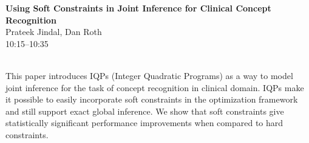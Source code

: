 \documentclass[twoside,makeidx]{book}
\begin{document}
\par\vspace{2em}\noindent%
\begin{minipage}{\linewidth}%
\begin{center}
\textbf{\normalsize Using Soft Constraints in Joint Inference for Clinical Concept Recognition}\\
\normalsize  Prateek Jindal,  Dan Roth\\
{\small 10:15--10:35}\\
\end{center}
\end{minipage}\\[0.5em]
\nopagebreak%
\noindent%
{\small This paper introduces IQPs (Integer Quadratic Programs) as a way to model joint inference for the task of concept recognition in clinical domain. IQPs make it possible to easily incorporate soft constraints in the optimization framework and still support exact global inference. We show that soft constraints give statistically significant performance improvements when compared to hard constraints.}
\clearpage
\end{document}
